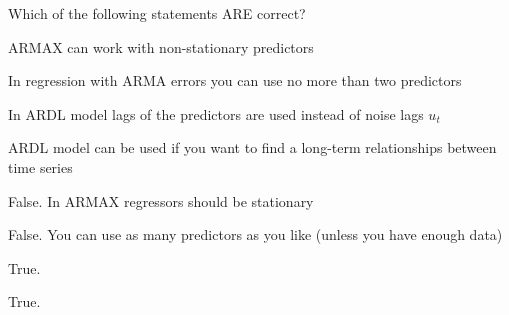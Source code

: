 
\begin{question}
Which of the following statements ARE correct?
\begin{answerlist}
  \item ARMAX can work with non-stationary predictors
  \item In regression with ARMA errors you can use no more than two predictors
  \item In ARDL model lags of the predictors are used instead of noise lags \(u_t\)
  \item ARDL model can be used if you want to find a long-term relationships between time series
\end{answerlist}
\end{question}

\begin{solution}
\begin{answerlist}
  \item False. In ARMAX regressors should be stationary
  \item False. You can use as many predictors as you like (unless you have enough data)
  \item True.
  \item True.
\end{answerlist}
\end{solution}

